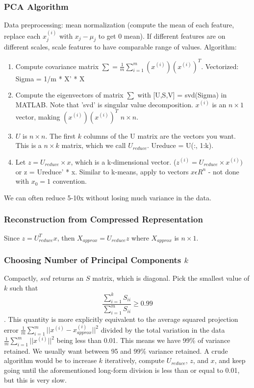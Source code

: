 \documentclass[11pt,letterpaper]{article}
\begin{document}
\subsubsection{PCA Algorithm}
Data preprocessing: mean normalization (compute the mean of each feature, replace each $x_j^{(i)}$ with $x_j - \mu_j$ to get 0 mean). If different features are on different scales, scale features to have comparable range of values. 
Algorithm:
\begin{enumerate}
	\item Compute covariance matrix $\sum = \frac{1}{m} \sum_{i=1}^{m} (x^{(i)})(x^{(i)})^T $. Vectorized: Sigma = 1/m * X' * X
	\item Compute the eigenvectors of matrix $\sum$ with [U,S,V] = svd(Sigma) in MATLAB. Note that 'svd' is singular value decomposition. $x^{(i)}$ is an $n \times 1$ vector, making $(x^{(i)})(x^{(i)})^T$ $n \times n$.
	\item $U$ is $n \times n$. The first $k$ columns of the U matrix are the vectors you want. This is a $n \times k$ matrix, which we call $U_{reduce}$. Ureduce = U(:, 1:k).
	\item Let $z = U_{reduce} \times x$, which is a k-dimensional vector. ($z^{(i)} = U_{reduce} \times x^{(i)})$ or z = Ureduce' * x. Similar to k-means, apply to vectors $x \epsilon R^n$ - not done with $x_0 =1$ convention. 
\end{enumerate}
We can often reduce 5-10x without losing much variance in the data.

\subsubsection{Reconstruction from Compressed Representation}
Since $z = U_{reduce}^Tx$, then $X_{approx} = U_{reduce} z$ where $X_{approx}$ is $n \times 1$. 

\subsubsection{Choosing Number of Principal Components $k$}
Compactly, $svd$ returns an $S$ matrix, which is diagonal. Pick the smallest value of $k$ such that $$\frac{\sum_{i=1}^{k}S_{ii}}{\sum_{i=1}^mS_{ii}}\geq 0.99$$. This quantity is more explicitly equivalent to the average squared projection error $\frac{1}{m} \sum_{i=1}^{m} ||x^{(i)} - x_{approx}^{(i)}||^2$ divided by the total variation in the data $\frac{1}{m} \sum_{i=1}^{m} ||x^{(i)}||^2$ being less than 0.01. This means we have 99\% of variance retained. We usually want between 95 and 99\% variance retained. A crude algorithm would be to increase $k$ iteratively, compute $U_{reduce}$, $z$, and $x$, and keep going until the aforementioned long-form division is less than or equal to 0.01, but this is very slow.\\
\end{document}
